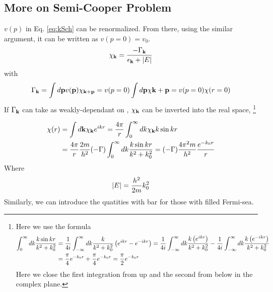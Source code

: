 \subsection{More on Semi-Cooper Problem}

$v(p)$ in Eq. \eqref{eq:kSch} can be renormalized.  From there, using the similar argument, it can be written as $v(p=0)=v_0$. 
\begin{equation}
 \chi_{\mathbf{k}}=\frac{-\Gamma_{\mathbf{k}}}{\epsilon_{\mathbf{k}}+\lvert{E}\rvert}
\end{equation}
with
\begin{equation}
 \Gamma_{\mathbf{k}}=\int{d\ensuremath{\mathbf{p}}{}v(\ensuremath{\mathbf{p}})\chi_{\ensuremath{\mathbf{k}}+\ensuremath{\mathbf{p}}}=v(p=0)\int{d\ensuremath{\mathbf{p}}\chi{\ensuremath{\mathbf{k}}+\ensuremath{\mathbf{p}}}}=v(p=0)\chi(r=0)}
\end{equation}
If $\Gamma_{\mathbf{k}}$ can take as weakly-dependant on \vk, $\chi_{\mathbf{k}}$ can be inverted into the real space,
\footnote{
 Here we use the formula 
\begin{equation}
\begin{split}
\int^\infty_0{dk\frac{k\sin{kr}}{k^2+k_0^2}}&=\frac{1}{4i}\int^{\infty}_{-\infty}{dk\frac{k}{k^2+k_0^2}\left(e^{ikr}-e^{-ikr}\right)}=\frac{1}{4i}\int^{\infty}_{-\infty}{dk\frac{k\left(e^{ikr}\right)}{k^2+k_0^2}}-\frac{1}{4i}\int^{\infty}_{-\infty}{dk\frac{k\left(e^{-ikr}\right)}{k^2+k_0^2}}\\
&=\frac{\pi}{4}e^{-k_0r}+\frac{\pi}{4}e^{-k_0r}=\frac{\pi}{2}e^{-k_0r} 
\end{split}
\end{equation}
Here we close the first integration from up and the second from below in the complex plane.   
}
   

\begin{equation}
\begin{split}
 \chi(r)&=\int{d\ensuremath{\mathbf{k}}\chi_{\ensuremath{\mathbf{k}}}{}e^{ikr}}=\frac{4\pi}{r}\int^\infty_0{dk\chi_{\mathbf{k}}{}k\sin{kr}}\\
&=\frac{4\pi}{r}\frac{2m}{h^2}(-\Gamma)\int^\infty_0{dk\frac{k\sin{kr}}{k^2+k_0^2}}=(-\Gamma)\frac{4\pi^2m}{h^2}\frac{e^{-k_0r}}{r}
\end{split}
\end{equation}
Where 
\begin{equation}
 \lvert{E}\rvert=\frac{h^2}{2m}k_0^2
\end{equation}
Similarly, we can introduce the quatities with bar for those with filled Fermi-sea. 
  